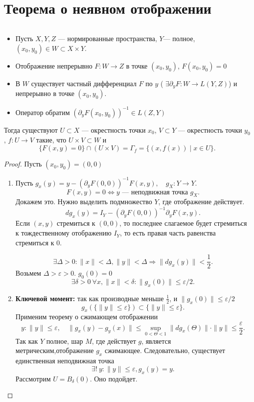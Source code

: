 \documentclass[11pt,dvipsnames]{report}
\begin{document}
\section{Теорема о неявном отображении}
\begin{thm}
    $ $
    \begin{itemize}[noitemsep]
	\item Пусть $ X, Y, Z$ --- нормированные пространства,   $ Y$--- полное, $ (x_0, y_0) \in W \subset X \times Y$.
	\item Отображение непрерывно $ F \colon W \to  Z$ в точке $ (x_0, y_0)$, $ F(x_0, y_0) = 0$
	    \item В $ W$ существует частный дифференциал  $ F$ по  $ y$ ( $ \exists  \partial _y F \colon W \to  L(Y, Z)$) и непрерывно в точке $ (x_0, y_0)$.
	    \item  Оператор обратим $ (\partial _yF(x_0, y_0) )^{-1} \in  L(Z, Y)$
    \end{itemize}
    Тогда существуют $ U \subset X$ --- окрестность точки $ x_0$, $ V \subset Y$ --- окрестность точки $ y_0$, $ f\colon U \to  V$ такие, что $ U \times V \subset W$ и
    \[
	\{F(x, y) = 0\} \cap (U \times V) = \Gamma _f = \{(x, f(x)) \mid x \in U\}
    .\] 
\end{thm}
\begin{proof}
    Пусть $ (x_0, y_0) = (0, 0)$
    \begin{enumerate}[noitemsep]
	\item Пусть $ g_x (y) = y - \left( \partial _yF(0, 0) \right)^{-1}F(x, y) , \quad g_X\colon Y \to  Y $.
	    \[
		F(x, y) = 0 \Longleftrightarrow y \text{ --- неподвижная точка  } g_X
	    .\] 
	    Докажем это. Нужно выделить подмножество $ Y$, где отображение действует.
	     \[
		 d g_x(y) = I_Y - \left( \partial _yF(0, 0) \right)^{-1}\partial _y F(x, y)
	    .\] 
	    Если $ (x, y)$ стремиться к  $ (0, 0)$, то последнее слагаемое будет стремиться к тождественному отображению  $ I_Y$, то есть правая часть равенства стремиться к 0. 

	    \[
		\exists  \Delta > 0\colon \| x \|  < \Delta , \| y \| < \Delta  \Longrightarrow \| d g_{x}(y) \|  <\frac{1}{2}
	    .\] 
	    Возьмем $ \Delta > \varepsilon > 0$. $ g_0(0) = 0$
	     \[
		 \exists \delta >0 ~ \forall x , \|  x  \| < \delta \colon \| g_x(0) \| \le \varepsilon /2  
	    .\] 

	\item {\bf Ключевой момент:}  
	    так как производные меньше $ \frac{1}{2}$, и $ \|g_x(0)\| \le \varepsilon /2$
	    \[
		g_x\left(\{\| y \| \le \varepsilon  \}\right) \subset \{\| y \| \le \varepsilon  \}
	    .\] 
	    Применим теорему о сжимающем отображении
	    \[
		y \colon \|  y \| \le \varepsilon, \quad	\| g_x(y) - g_y(x) \|  \le \sup_{0 < \Theta < 1} \|  dg_x(\Theta) \| \cdot \| y \| \le  \frac{\varepsilon}{2}
	    .\] 
	    Так как $ Y$ полное, шар $ M$, где действует $ g$, является метрическим,отображение $ g_x$ сжимающее. Следовательно, существует единственная неподвижная точка
	     \[
		 \exists ! ~y\colon \| y \| \le \varepsilon ,   g_x(y) = y
	     .\] 
	     Рассмотрим $ U = B_{\delta }(0)$. Оно подойдет.
    \end{enumerate}
\end{proof}
\end{document}
